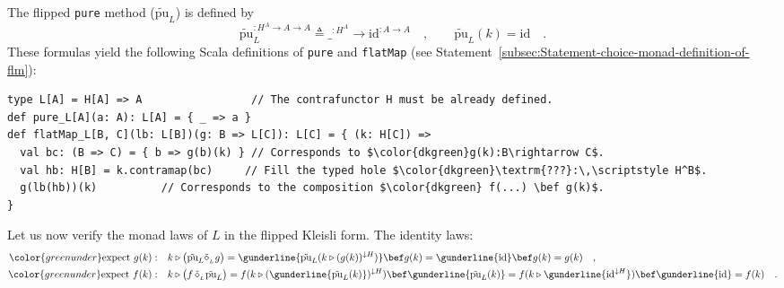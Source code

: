 The flipped \lstinline!pure! method ($\tilde{\text{pu}}_{L}$) is
defined by
\begin{equation}
\tilde{\text{pu}}_{L}^{:H^{A}\rightarrow A\rightarrow A}\triangleq\_^{:H^{A}}\rightarrow\text{id}^{:A\rightarrow A}\quad,\quad\quad\tilde{\text{pu}}_{L}(k)=\text{id}\quad.\label{eq:def-of-pure-for-exp-construction-h-a-a}
\end{equation}
These formulas yield the following Scala definitions of \lstinline!pure!
and \lstinline!flatMap! (see Statement~\ref{subsec:Statement-choice-monad-definition-of-flm}):
\begin{lstlisting}[mathescape=true]
type L[A] = H[A] => A                 // The contrafunctor H must be already defined.
def pure_L[A](a: A): L[A] = { _ => a }
def flatMap_L[B, C](lb: L[B])(g: B => L[C]): L[C] = { (k: H[C]) =>
  val bc: (B => C) = { b => g(b)(k) } // Corresponds to $\color{dkgreen}g(k):B\rightarrow C$.
  val hb: H[B] = k.contramap(bc)     // Fill the typed hole $\color{dkgreen}\textrm{???}:\,\scriptstyle H^B$.
  g(lb(hb))(k)          // Corresponds to the composition $\color{dkgreen} f(...) \bef g(k)$.
}
\end{lstlisting}

Let us now verify the monad laws of $L$ in the flipped Kleisli form.
The identity laws:
\begin{align*}
{\color{greenunder}\text{expect }g(k):}\quad & k\triangleright\big(\tilde{\text{pu}}_{L}\tilde{\diamond}_{_{L}}g\big)=\gunderline{\tilde{\text{pu}}_{L}(k\triangleright(g(k))^{\downarrow H})}\bef g(k)=\gunderline{\text{id}}\bef g(k)=g(k)\quad,\\
{\color{greenunder}\text{expect }f(k):}\quad & k\triangleright\big(f\,\tilde{\diamond}_{_{L}}\tilde{\text{pu}}_{L}\big)=f(k\triangleright(\gunderline{\tilde{\text{pu}}_{L}(k)})^{\downarrow H})\bef\gunderline{\tilde{\text{pu}}_{L}(k)}=f(k\triangleright\gunderline{\text{id}^{\downarrow H}})\bef\gunderline{\text{id}}=f(k)\quad.
\end{align*}

